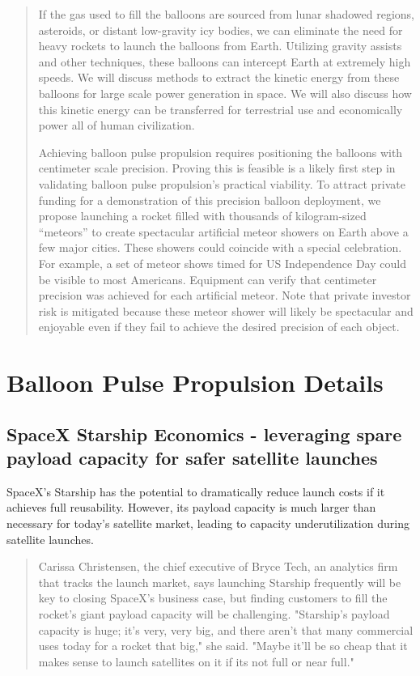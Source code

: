 \documentclass{article}
\begin{document}
\begin{abstract}
If the gas used to fill the balloons are sourced from lunar shadowed regions, asteroids, or distant low-gravity icy bodies, we can eliminate the need for heavy rockets to launch the balloons from Earth. Utilizing gravity assists and other techniques, these balloons can intercept Earth at extremely high speeds.    We will discuss methods to extract the kinetic energy from these balloons for large scale power generation in space.   We will also discuss how this kinetic energy can be transferred for terrestrial use and economically power all of human civilization.


Achieving balloon pulse propulsion requires positioning the balloons with centimeter scale precision.  Proving this is feasible is a likely first step in validating balloon pulse propulsion's practical viability.    To attract private funding for a demonstration of this precision balloon deployment, we propose launching a rocket filled with thousands of kilogram-sized “meteors” to create spectacular artificial meteor showers on Earth above a few major cities. These showers could coincide with a special celebration.   For example, a set of meteor shows timed for US Independence Day could be visible to most Americans.   Equipment can verify that centimeter precision was achieved for each artificial meteor.  Note that private investor risk is mitigated because these meteor shower will likely be spectacular and enjoyable even if they fail to achieve the desired precision of each object.   

\end{abstract}


\section{Balloon Pulse Propulsion Details}
\label{sec:pulse_modelling}
\subsection{SpaceX Starship Economics - leveraging spare payload capacity for safer satellite launches}
SpaceX’s Starship has the potential to dramatically reduce launch costs if it achieves full reusability. However, its payload capacity is much larger than necessary for today’s satellite market, leading to capacity underutilization during satellite launches.   \begin{quote}
Carissa Christensen, the chief executive of Bryce Tech, an analytics firm that tracks the launch market, says launching Starship frequently will be key to closing SpaceX’s business case, but finding customers to fill the rocket’s giant payload capacity will be challenging. 
"Starship's payload capacity is huge; it's very, very big, and there aren't that many commercial uses today for a rocket that big," she said.  "Maybe it'll be so cheap that it makes sense to launch satellites on it if its not full or near full." \cite{nyt_starship_size} \end{quote}
\end{document}
